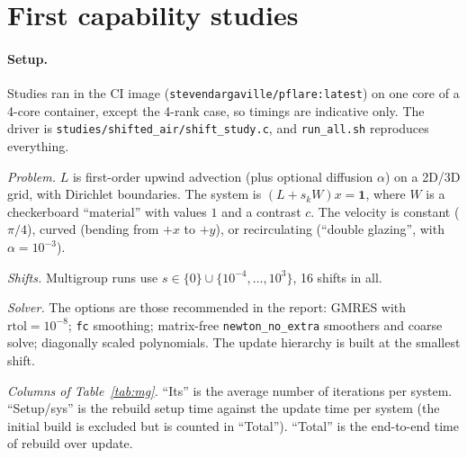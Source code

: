 \documentclass[11pt,a4paper]{article}
\begin{document}
\section{First capability studies}\label{sec:studies}
\paragraph{Setup.} Studies ran in the CI image (\texttt{stevendargaville/pflare:latest}) on one core of a 4-core container, except the 4-rank case, so timings are indicative only. The driver is \texttt{studies/shifted\_air/shift\_study.c}, and \texttt{run\_all.sh} reproduces everything.

\emph{Problem.} $L$ is first-order upwind advection (plus optional diffusion $\alpha$) on a 2D/3D grid, with Dirichlet boundaries. The system is $(L+s_k W)x=\mathbf 1$, where $W$ is a checkerboard ``material'' with values $1$ and a contrast $c$. The velocity is constant ($\pi/4$), curved (bending from $+x$ to $+y$), or recirculating (``double glazing'', with $\alpha=10^{-3}$).

\emph{Shifts.} Multigroup runs use $s\in\{0\}\cup\{10^{-4},\dots,10^{3}\}$, 16 shifts in all.

\emph{Solver.} The options are those recommended in the report: GMRES with $\mathrm{rtol}=10^{-8}$; \texttt{fc} smoothing; matrix-free \texttt{newton\_no\_extra} smoothers and coarse solve; diagonally scaled polynomials. The update hierarchy is built at the smallest shift.

\emph{Columns of Table~\ref{tab:mg}.} ``Its'' is the average number of iterations per system. ``Setup/sys'' is the rebuild setup time against the update time per system (the initial build is excluded but is counted in ``Total''). ``Total'' is the end-to-end time of rebuild over update.
\end{document}
